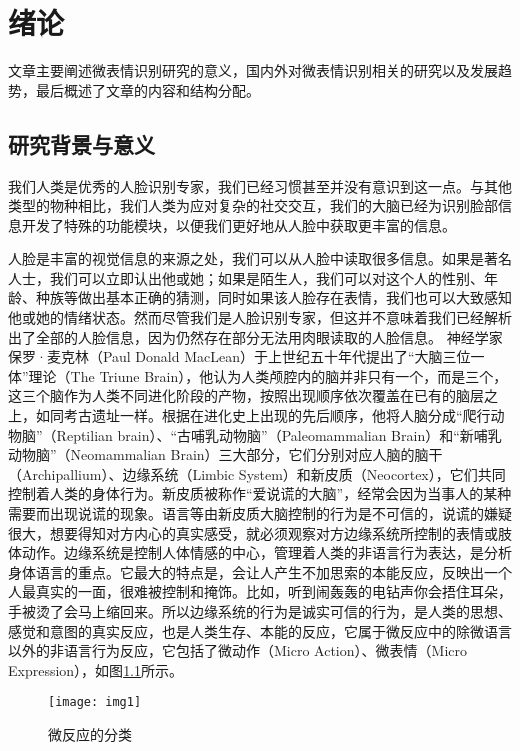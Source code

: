 \chapter{绪论}\label{chap:introduction}
文章主要阐述微表情识别研究的意义，国内外对微表情识别相关的研究以及发展趋势，最后概述了文章的内容和结构分配。
\section{研究背景与意义}

我们人类是优秀的人脸识别专家，我们已经习惯甚至并没有意识到这一点。与其他类型的物种相比，我们人类为应对复杂的社交交互，我们的大脑已经为识别脸部信息开发了特殊的功能模块，以便我们更好地从人脸中获取更丰富的信息。

人脸是丰富的视觉信息的来源之处，我们可以从人脸中读取很多信息。如果是著名人士，我们可以立即认出他或她；如果是陌生人，我们可以对这个人的性别、年龄、种族等做出基本正确的猜测，同时如果该人脸存在表情，我们也可以大致感知他或她的情绪状态。然而尽管我们是人脸识别专家，但这并不意味着我们已经解析出了全部的人脸信息，因为仍然存在部分无法用肉眼读取的人脸信息。
神经学家保罗·麦克林（Paul Donald MacLean）于上世纪五十年代提出了“大脑三位一体”理论（The Triune Brain），他认为人类颅腔内的脑并非只有一个，而是三个，这三个脑作为人类不同进化阶段的产物，按照出现顺序依次覆盖在已有的脑层之上，如同考古遗址一样\citep{Brain1999Kazlev}。根据在进化史上出现的先后顺序，他将人脑分成“爬行动物脑”（Reptilian brain）、“古哺乳动物脑”（Paleomammalian Brain）和“新哺乳动物脑”（Neomammalian Brain）三大部分，它们分别对应人脑的脑干（Archipallium）、边缘系统（Limbic System）和新皮质（Neocortex），它们共同控制着人类的身体行为。新皮质被称作“爱说谎的大脑”，经常会因为当事人的某种需要而出现说谎的现象。语言等由新皮质大脑控制的行为是不可信的，说谎的嫌疑很大，想要得知对方内心的真实感受，就必须观察对方边缘系统所控制的表情或肢体动作。边缘系统是控制人体情感的中心，管理着人类的非语言行为表达，是分析身体语言的重点。它最大的特点是，会让人产生不加思索的本能反应，反映出一个人最真实的一面，很难被控制和掩饰。比如，听到闹轰轰的电钻声你会捂住耳朵，手被烫了会马上缩回来。所以边缘系统的行为是诚实可信的行为，是人类的思想、感觉和意图的真实反应，也是人类生存、本能的反应，它属于微反应中的除微语言以外的非语言行为反应，它包括了微动作（Micro Action）、微表情（Micro Expression），如图\ref{fig1}所示。

\begin{figure}[!htbp]
    \centering
    \texttt{[image: img1]}
    \caption{微反应的分类}   %
    \label{fig1}
\end{figure}

